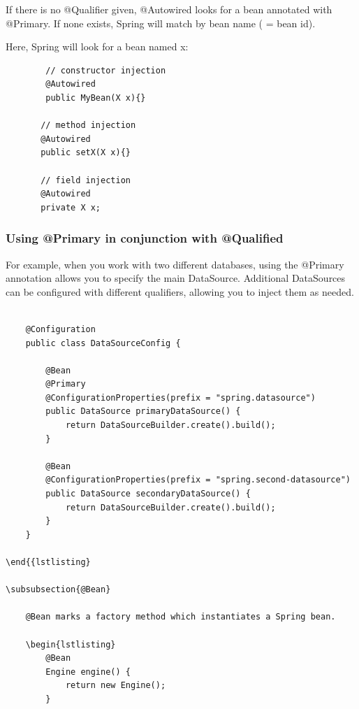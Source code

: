 \documentclass{scrartcl}
\begin{document}
    If there is no @Qualifier given, @Autowired looks for a bean annotated with @Primary. If none exists, Spring will match by bean name ( = bean id).

    Here, Spring will look for a bean named x:

    \begin{lstlisting}
        // constructor injection
        @Autowired
        public MyBean(X x){}

       // method injection
       @Autowired
       public setX(X x){}

       // field injection
       @Autowired
       private X x;
    \end{lstlisting}

\subsubsection{Using @Primary in conjunction with @Qualified}

For example, when you work with two different databases, using the @Primary annotation allows you to specify the main DataSource. Additional DataSources can be configured with different qualifiers, allowing you to inject them as needed.

\begin{lstlisting}

    @Configuration
    public class DataSourceConfig {

        @Bean
        @Primary
        @ConfigurationProperties(prefix = "spring.datasource")
        public DataSource primaryDataSource() {
            return DataSourceBuilder.create().build();
        }

        @Bean
        @ConfigurationProperties(prefix = "spring.second-datasource")
        public DataSource secondaryDataSource() {
            return DataSourceBuilder.create().build();
        }
    }

\end{{lstlisting}

\subsubsection{@Bean}

    @Bean marks a factory method which instantiates a Spring bean.

    \begin{lstlisting}
        @Bean
        Engine engine() {
            return new Engine();
        }
    \end{lstlisting}
\end{document}
